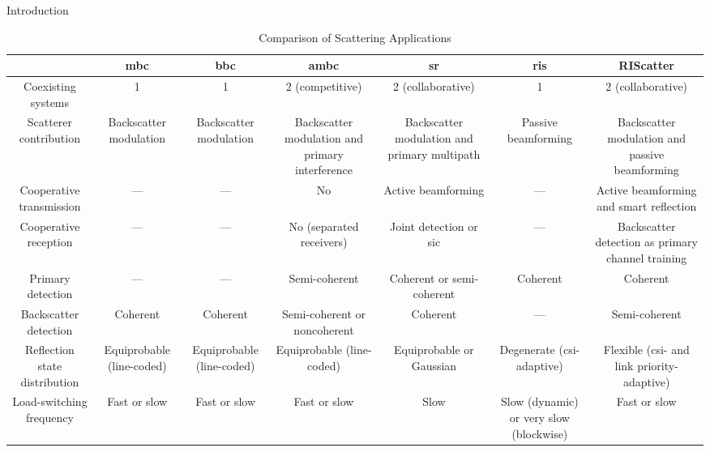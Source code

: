 \documentclass[journal]{IEEEtran}
\begin{document}
\begin{section}{Introduction}
	\begin{table*}[]
		\caption{Comparison of Scattering Applications}
		\begin{tabularx}{\textwidth}{CCCCCCC}
			\toprule
			                              & \gls{mbc}                 & \gls{bbc}                 & \gls{ambc}                                      & \gls{sr}                                     & \gls{ris}                               & RIScatter                                         \\ \midrule
			Coexisting systems            & 1                         & 1                         & 2 (competitive)                                 & 2 (collaborative)                            & 1                                       & 2 (collaborative)                                 \\ \midrule
			Scatterer contribution        & Backscatter modulation    & Backscatter modulation    & Backscatter modulation and primary interference & Backscatter modulation and primary multipath & Passive beamforming                     & Backscatter modulation and passive beamforming    \\ \midrule
			Cooperative transmission      & ---                       & ---                       & No                                              & Active beamforming                           & ---                                     & Active beamforming and smart reflection           \\ \midrule
			Cooperative reception         & ---                       & ---                       & No (separated receivers)                        & Joint detection or \gls{sic}                 & ---                                     & Backscatter detection as primary channel training \\ \midrule
			Primary detection             & ---                       & ---                       & Semi-coherent                                   & Coherent or semi-coherent                    & Coherent                                & Coherent                                          \\ \midrule
			Backscatter detection         & Coherent                  & Coherent                  & Semi-coherent or noncoherent                    & Coherent                                     & ---                                     & Semi-coherent                                     \\ \midrule
			Reflection state distribution & Equiprobable (line-coded) & Equiprobable (line-coded) & Equiprobable (line-coded)                       & Equiprobable or Gaussian                     & Degenerate (\gls{csi}-adaptive)         & Flexible (\gls{csi}- and link priority-adaptive)  \\ \midrule
			Load-switching frequency      & Fast or slow              & Fast or slow              & Fast or slow                                    & Slow                                         & Slow (dynamic) or very slow (blockwise) & Fast or slow                                      \\ \bottomrule
		\end{tabularx}
	\end{table*}


\end{section}
\end{document}
